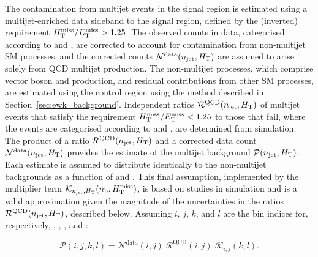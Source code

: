 The contamination from multijet events in the signal region is
estimated using a multijet-enriched data sideband to the signal
region, defined by the (inverted) requirement $H_{\mathrm{T}}^{\text{miss}} / E_{\mathrm{T}}^{\text{miss}} > 1.25$. The
observed counts in data, categorised according to \njet and \scalht,
are corrected to account for contamination from non-multijet SM
processes, and the corrected counts $\mathcal{N}^\text{data}(n_{\text{jet}},
H_{\mathrm{T}})$ are assumed to arise solely from QCD multijet
production. The non-multijet processes, which comprise vector boson
and \ttbar production, and residual contributions from other SM
processes, are estimated using the \mj control region using the method
described in Section~\ref{sec:ewk_background}. Independent ratios
$\mathcal{R}^\text{QCD}(n_{\text{jet}}, H_{\mathrm{T}})$ of multijet events that
satisfy the requirement $H_{\mathrm{T}}^{\text{miss}} / E_{\mathrm{T}}^{\text{miss}} < 1.25$ to those that fail, where the
events are categorised according to \njet and \scalht, are determined
from simulation. The product of a ratio $\mathcal{R}^\text{QCD}(n_{\text{jet}},
H_{\mathrm{T}})$ and a corrected data count $\mathcal{N}^\text{data}(n_{\text{jet}},
H_{\mathrm{T}})$ provides the estimate of the multijet background
$\mathcal{P}(n_{\text{jet}}, H_{\mathrm{T}})$. Each estimate is assumed to distribute
identically to the non-multijet backgrounds as a function of \nb and
\HTmiss. This final assumption, implemented by the multiplier term
$\mathcal{K}_{n_{\text{jet}}, H_{\mathrm{T}}}(n_{\text{b}}, H_{\text{T}}^{\text{miss}})$, is based on studies in
simulation and is a valid approximation given the magnitude of the
uncertainties in the ratios $\mathcal{R}^\text{QCD}(n_{\text{jet}}, H_{\mathrm{T}})$,
described below. 
Assuming $i$, $j$, $k$, and $l$ are the bin indices for, respectively,
\njet, \scalht, \nb, and \HTmiss:

\begin{equation}
  \label{eq:qcd}
  \mathcal{P}( i, j, k, l ) =
  \mathcal{N}^\text{data}( i, j )\;
  \mathcal{R}^\text{QCD}( i, j )\;
  \mathcal{K}_{i,j}( k, l ).
\end{equation}

